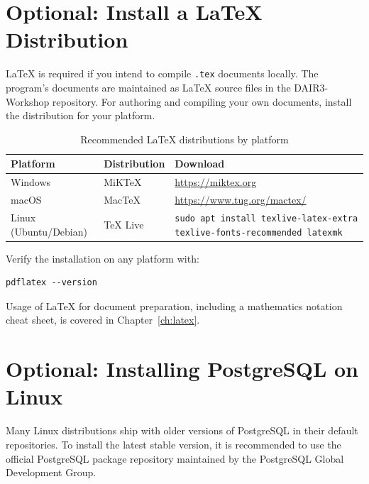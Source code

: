 \section{Optional: Install a \LaTeX{} Distribution}\label{sec:latex-install}

\LaTeX{} is required if you intend to compile \texttt{.tex} documents
locally. The program's documents are maintained as \LaTeX{} source files
in the DAIR3-Workshop repository. For authoring and compiling your own
documents, install the distribution for your platform.

\begin{table}[htbp]
\centering
\caption{Recommended \LaTeX{} distributions by platform}
\label{tab:latex-distros}
\begin{tabular}{llp{7.5cm}}
\toprule
\textbf{Platform} & \textbf{Distribution} & \textbf{Download} \\
\midrule
Windows & MiKTeX & \url{https://miktex.org} \\
macOS & MacTeX & \url{https://www.tug.org/mactex/} \\
Linux (Ubuntu/Debian) & TeX Live & \texttt{sudo apt install texlive-latex-extra texlive-fonts-recommended latexmk} \\
\bottomrule
\end{tabular}
\end{table}

Verify the installation on any platform with:

\begin{verbatim}
pdflatex --version
\end{verbatim}

\vs
\noindent
Usage of \LaTeX{} for document preparation, including a mathematics
notation cheat sheet, is covered in Chapter~\ref{ch:latex}.
\vs

\section{Optional: Installing PostgreSQL on Linux}
Many Linux distributions ship with older versions of PostgreSQL in their
default repositories. To install the latest stable version, it is recommended
to use the official PostgreSQL package repository maintained by the
PostgreSQL Global Development Group.

